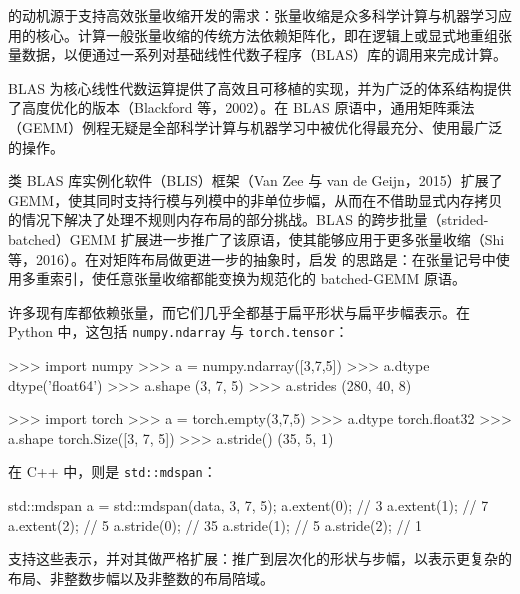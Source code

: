 
\CuTe 的动机源于支持高效张量收缩开发的需求：张量收缩是众多科学计算与机器学习应用的核心。计算一般张量收缩的传统方法依赖矩阵化，即在逻辑上或显式地重组张量数据，以便通过一系列对基础线性代数子程序（BLAS）库的调用来完成计算。


BLAS 为核心线性代数运算提供了高效且可移植的实现，并为广泛的体系结构提供了高度优化的版本（Blackford 等，2002）。在 BLAS 原语中，通用矩阵乘法（GEMM）例程无疑是全部科学计算与机器学习中被优化得最充分、使用最广泛的操作。

类 BLAS 库实例化软件（BLIS）框架（Van Zee 与 van de Geijn，2015）扩展了 GEMM，使其同时支持行模与列模中的非单位步幅，从而在不借助显式内存拷贝的情况下解决了处理不规则内存布局的部分挑战。BLAS 的跨步批量（strided-batched）GEMM 扩展进一步推广了该原语，使其能够应用于更多张量收缩（Shi 等，2016）。在对矩阵布局做更进一步的抽象时，启发 \CuTe 的思路是：在张量记号中使用多重索引，使任意张量收缩都能变换为规范化的 batched-GEMM 原语。

许多现有库都依赖张量，而它们几乎全都基于扁平形状与扁平步幅表示。在 Python 中，这包括 {\tt numpy.ndarray} 与 {\tt torch.tensor}：

\noindent
\begin{minipage}[t]{0.48\textwidth}
\begin{python}
>>> import numpy
>>> a = numpy.ndarray([3,7,5])
>>> a.dtype
dtype('float64')
>>> a.shape
(3, 7, 5)
>>> a.strides
(280, 40, 8)
\end{python}
\end{minipage}
\hfill
\begin{minipage}[t]{0.48\textwidth}
\begin{python}
>>> import torch
>>> a = torch.empty(3,7,5)
>>> a.dtype
torch.float32
>>> a.shape
torch.Size([3, 7, 5])
>>> a.stride()
(35, 5, 1)
\end{python}
\end{minipage}

\noindent 在 C++ 中，则是 {\tt std::mdspan}：

\noindent
\begin{cpp}
std::mdspan a = std::mdspan(data, 3, 7, 5);
a.extent(0);  // 3
a.extent(1);  // 7
a.extent(2);  // 5
a.stride(0);  // 35
a.stride(1);  // 5
a.stride(2);  // 1
\end{cpp}

\noindent \CuTe 支持这些表示，并对其做严格扩展：推广到层次化的形状与步幅，以表示更复杂的布局、非整数步幅以及非整数的布局陪域。

